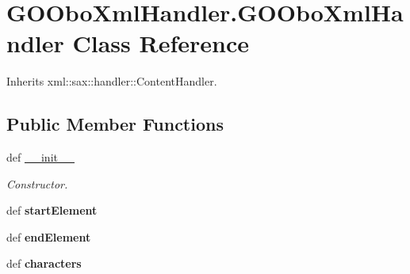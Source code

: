 \hypertarget{class_g_o_obo_xml_handler_1_1_g_o_obo_xml_handler}{
\section{GOOboXmlHandler.GOOboXmlHandler Class Reference}
\label{class_g_o_obo_xml_handler_1_1_g_o_obo_xml_handler}
}


Inherits xml::sax::handler::ContentHandler.

\subsection*{Public Member Functions}
\begin{DoxyCompactItemize}
\item 
def \hyperlink{class_g_o_obo_xml_handler_1_1_g_o_obo_xml_handler_a8317674e5f4b100aabbe53ddf368bb26}{\_\-\_\-init\_\-\_\-}
\begin{DoxyCompactList}\small\item\em Constructor. \item\end{DoxyCompactList}\item 
\hypertarget{class_g_o_obo_xml_handler_1_1_g_o_obo_xml_handler_acf717862e0d74ded0ba251edf98d52af}{
def {\bfseries startElement}}
\label{class_g_o_obo_xml_handler_1_1_g_o_obo_xml_handler_acf717862e0d74ded0ba251edf98d52af}

\item 
\hypertarget{class_g_o_obo_xml_handler_1_1_g_o_obo_xml_handler_ab7da652c8f67bc009e89925f40c4a3dd}{
def {\bfseries endElement}}
\label{class_g_o_obo_xml_handler_1_1_g_o_obo_xml_handler_ab7da652c8f67bc009e89925f40c4a3dd}

\item 
\hypertarget{class_g_o_obo_xml_handler_1_1_g_o_obo_xml_handler_a46b9cda18213754ee2a48ed5a480324d}{
def {\bfseries characters}}
\label{class_g_o_obo_xml_handler_1_1_g_o_obo_xml_handler_a46b9cda18213754ee2a48ed5a480324d}

\end{DoxyCompactItemize}
